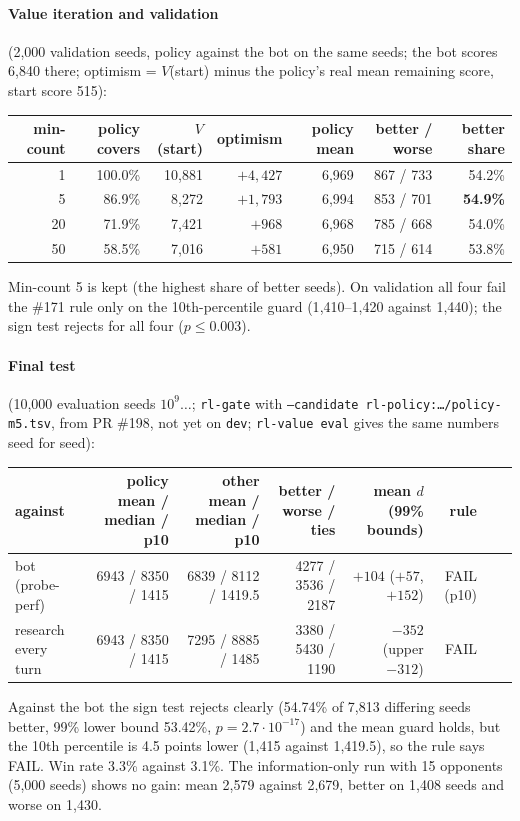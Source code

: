 \documentclass{../polyexp}
\begin{document}
\paragraph{Value iteration and validation} (2{,}000 validation seeds, policy against the bot on the same seeds;
the bot scores 6{,}840 there; optimism = $V$(start) minus the policy's real mean remaining score, start score 515):

\begin{center}\small
\begin{tabular}{rrrrrrr}
\toprule
min-count & policy covers & $V$(start) & optimism & policy mean & better / worse & better share \\
\midrule
1  & 100.0\% & 10{,}881 & $+4{,}427$ & 6{,}969 & 867 / 733 & 54.2\% \\
5  & 86.9\%  & 8{,}272  & $+1{,}793$ & 6{,}994 & 853 / 701 & \textbf{54.9\%} \\
20 & 71.9\%  & 7{,}421  & $+968$     & 6{,}968 & 785 / 668 & 54.0\% \\
50 & 58.5\%  & 7{,}016  & $+581$     & 6{,}950 & 715 / 614 & 53.8\% \\
\bottomrule
\end{tabular}
\end{center}
Min-count 5 is kept (the highest share of better seeds). On validation all four fail the \#171 rule only on the
10th-percentile guard (1{,}410--1{,}420 against 1{,}440); the sign test rejects for all four ($p \le 0.003$).

\paragraph{Final test} (10{,}000 evaluation seeds $10^9\dots$; \texttt{rl-gate} with
\texttt{--candidate rl-policy:\dots/policy-m5.tsv}, from PR \#198, not yet on \texttt{dev}; \texttt{rl-value eval}
gives the same numbers seed for seed):

\begin{center}\small
\begin{tabular}{lrrrrrrl}
\toprule
against & policy mean / median / p10 & other mean / median / p10 & better / worse / ties & mean $d$ (99\% bounds) & rule \\
\midrule
bot (probe-perf) & 6943 / 8350 / 1415 & 6839 / 8112 / 1419.5 & 4277 / 3536 / 2187 & $+104$ ($+57$, $+152$) & FAIL (p10) \\
research every turn & 6943 / 8350 / 1415 & 7295 / 8885 / 1485 & 3380 / 5430 / 1190 & $-352$ (upper $-312$) & FAIL \\
\bottomrule
\end{tabular}
\end{center}
Against the bot the sign test rejects clearly (54.74\% of 7{,}813 differing seeds better, 99\% lower bound 53.42\%,
$p = 2.7\cdot10^{-17}$) and the mean guard holds, but the 10th percentile is 4.5 points lower (1{,}415 against
1{,}419.5), so the rule says FAIL. Win rate 3.3\% against 3.1\%. The information-only run with 15 opponents (5{,}000
seeds) shows no gain: mean 2{,}579 against 2{,}679, better on 1{,}408 seeds and worse on 1{,}430.
\end{document}
